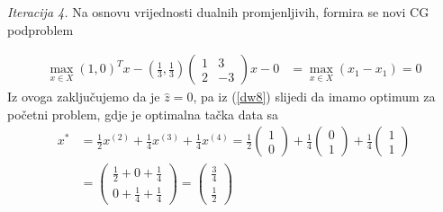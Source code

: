 \documentclass[a4paper, utf8, 11pt, colorlinks]{book}
\theoremstyle{definition}
\begin{document}
\vspace{5mm}

\emph{Iteracija 4.} Na osnovu vrijednosti dualnih promjenljivih, formira se novi CG podproblem
 
	 \begin{align*}
		\max_{x \in X} (1, 0)^T x - \left(\frac{1}{3}, \frac{1}{3}\right)\left(\begin{array}{cc}
			1 & 3 \\
			2 & -3
		\end{array}\right)  x   - 0 &= \max_{x \in X} (x_1  - x_1 ) = 0    
	\end{align*} 
  Iz ovoga zaključujemo da je $\hat{z}=0$, pa iz (\ref{dw8}) slijedi da imamo optimum za početni problem, gdje je optimalna tačka data sa 
\begin{align*}
  	 x^* &= \frac{1}{2}  x^{(2)}+ \frac{1}{4} x^{(3)} + \frac{1}{4} x^{(4)} 
  	     = \frac{1}{2} \begin{pmatrix}
  	     	      1 \\
  	     	      0
  	     \end{pmatrix} +
       \frac{1}{4} \begin{pmatrix}
       	                  0 \\
       	                  1
       \end{pmatrix} +
   \frac{1}{4} \begin{pmatrix}
   	                  1 \\
   	                  1
   \end{pmatrix}\\
   &= \begin{pmatrix}
   	        \frac{1}{2} + 0 + \frac{1}{4} \\
   	        0 + \frac{1}{4} + \frac{1}{4}
   \end{pmatrix} = \begin{pmatrix}
         \frac{3}{4} \\
         \frac{1}{2}
  \end{pmatrix}
\end{align*}
\vspace{1cm} \\
\end{document}
